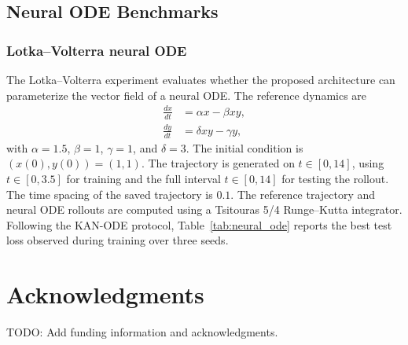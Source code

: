 \documentclass[preprint,12pt]{elsarticle}
\begin{document}
\subsection{Neural ODE Benchmarks}
\label{app:neural_ode_benchmarks}

\subsubsection{Lotka--Volterra neural ODE}

The Lotka--Volterra experiment evaluates whether the proposed architecture can parameterize the vector field of a neural ODE. The reference dynamics are
\begin{equation}
\begin{aligned}
  \frac{dx}{dt} &= \alpha x-\beta xy,\\
  \frac{dy}{dt} &= \delta xy-\gamma y,
\end{aligned}
\end{equation}
with \(\alpha=1.5\), \(\beta=1\), \(\gamma=1\), and \(\delta=3\). The initial condition is \((x(0),y(0))=(1,1)\). The trajectory is generated on \(t\in[0,14]\), using \(t\in[0,3.5]\) for training and the full interval \(t\in[0,14]\) for testing the rollout. The time spacing of the saved trajectory is \(0.1\). The reference trajectory and neural ODE rollouts are computed using a Tsitouras 5/4 Runge--Kutta integrator. Following the KAN-ODE protocol, Table~\ref{tab:neural_ode} reports the best test loss observed during training over three seeds.

\section*{Acknowledgments}

TODO: Add funding information and acknowledgments.
\end{document}
